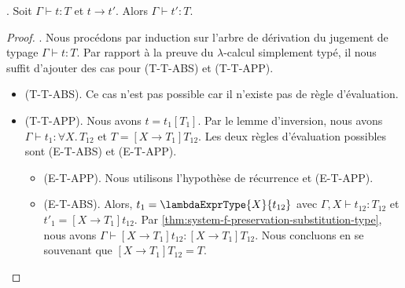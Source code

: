 \begin{theorem} 
  \label{thm:system-f-preservation}.
  Soit $\Gamma \vdash t : T$ et $t \rightarrow t'$. Alors $\Gamma \vdash t' :
  T$.
\end{theorem}

\begin{proof}
  \label{thm:system-f-preservation-proof}. Nous procédons par induction sur
  l'arbre de dérivation du jugement de typage $\Gamma \vdash t : T$. Par rapport
  à la preuve du $\lambda$-calcul simplement typé, il nous
  suffit d'ajouter des cas pour (T-T-ABS) et (T-T-APP).

  \begin{itemize}
  \item (T-T-ABS). Ce cas n'est pas possible car il n'existe pas de règle d'évaluation.
  \item (T-T-APP). Nous avons $t = t_{1}[T_{1}]$. Par le lemme d'inversion, nous
    avons $\Gamma \vdash t_{1} : \forall X . \, T_{12}$ et $T = [X \rightarrow
  T_{1}] T_{12}$. Les deux règles d'évaluation possibles sont (E-T-ABS) et
  (E-T-APP).
    \begin{itemize}
    \item (E-T-APP). Nous utilisons l'hypothèse de récurrence et (E-T-APP).
    \item (E-T-ABS). Alors, $t_{1} = \lambdaExprType{X}{t_{12}}$ avec $\Gamma, X
      \vdash t_{12} : T_{12}$ et $t'_{1} = [X \rightarrow T_{1}] t_{12}$. Par
     \ref{thm:system-f-preservation-substitution-type}, nous avons $\Gamma \vdash
     [X \rightarrow T_{1}] t_{12} : [X \rightarrow T_{1}] T_{12}$. Nous concluons
     en se souvenant que $[X \rightarrow T_{1}]T_{12} = T$.
    \end{itemize}
  \end{itemize}
\end{proof}
